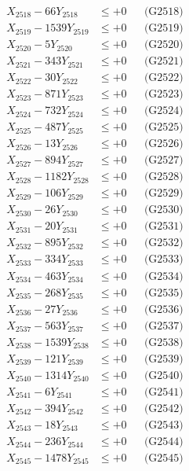 \documentclass[a4paper,10pt]{article}
\begin{document}
{\begin{align}
X_{2518} - 66Y_{2518} &\leq +0 && \text{(G2518)} \\
X_{2519} - 1539Y_{2519} &\leq +0 && \text{(G2519)} \\
X_{2520} - 5Y_{2520} &\leq +0 && \text{(G2520)} \\
\allowbreak
X_{2521} - 343Y_{2521} &\leq +0 && \text{(G2521)} \\
X_{2522} - 30Y_{2522} &\leq +0 && \text{(G2522)} \\
X_{2523} - 871Y_{2523} &\leq +0 && \text{(G2523)} \\
X_{2524} - 732Y_{2524} &\leq +0 && \text{(G2524)} \\
X_{2525} - 487Y_{2525} &\leq +0 && \text{(G2525)} \\
X_{2526} - 13Y_{2526} &\leq +0 && \text{(G2526)} \\
X_{2527} - 894Y_{2527} &\leq +0 && \text{(G2527)} \\
X_{2528} - 1182Y_{2528} &\leq +0 && \text{(G2528)} \\
X_{2529} - 106Y_{2529} &\leq +0 && \text{(G2529)} \\
X_{2530} - 26Y_{2530} &\leq +0 && \text{(G2530)} \\
\allowbreak
X_{2531} - 20Y_{2531} &\leq +0 && \text{(G2531)} \\
X_{2532} - 895Y_{2532} &\leq +0 && \text{(G2532)} \\
X_{2533} - 334Y_{2533} &\leq +0 && \text{(G2533)} \\
X_{2534} - 463Y_{2534} &\leq +0 && \text{(G2534)} \\
X_{2535} - 268Y_{2535} &\leq +0 && \text{(G2535)} \\
X_{2536} - 27Y_{2536} &\leq +0 && \text{(G2536)} \\
X_{2537} - 563Y_{2537} &\leq +0 && \text{(G2537)} \\
X_{2538} - 1539Y_{2538} &\leq +0 && \text{(G2538)} \\
X_{2539} - 121Y_{2539} &\leq +0 && \text{(G2539)} \\
X_{2540} - 1314Y_{2540} &\leq +0 && \text{(G2540)} \\
\allowbreak
X_{2541} - 6Y_{2541} &\leq +0 && \text{(G2541)} \\
X_{2542} - 394Y_{2542} &\leq +0 && \text{(G2542)} \\
X_{2543} - 18Y_{2543} &\leq +0 && \text{(G2543)} \\
X_{2544} - 236Y_{2544} &\leq +0 && \text{(G2544)} \\
X_{2545} - 1478Y_{2545} &\leq +0 && \text{(G2545)} \\

\end{align}}
\end{document}
